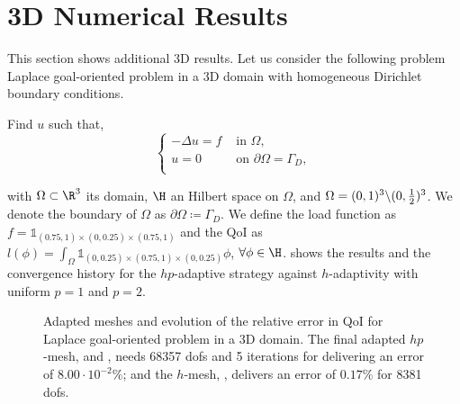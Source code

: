 \section{3D Numerical Results}
\label{sec:Numerical3D}
This section shows additional 3D results. Let us consider the following problem Laplace goal-oriented problem in a $3$D domain with homogeneous Dirichlet boundary conditions.
\begin{var_for}
  Find $u$ such that,
  \begin{equation}
    \begin{cases}
      - \Delta u=f & \text{ in } \Omega,                       \\
      u=0          & \text{ on } {\partial \Omega=\Gamma_{D}}, \\
    \end{cases}
  \end{equation}
\end{var_for}
\noindent with $\Omega\subset \R^{3}$ its domain, $\H$ an Hilbert space on $\Omega$, and $\Omega=(0,1)^{3}\symbol{92} (0,\frac{1}{2})^{3}$. We denote the boundary of $\Omega$ as $\partial \Omega \coloneqq \Gamma_{D}$. We define the load function as $f =\mathds{1}_{(0.75,1) \times (0,0.25) \times (0.75,1)}$ and the \ac{QoI} as $l(\phi)=\int_{\Omega} \mathds{1}_{(0,0.25) \times (0.75,1) \times (0,0.25)}\phi$, $\forall \phi \in \H$.  shows the results and the convergence history for the $hp$-adaptive strategy against $h$-adaptivity with uniform $p=1$ and $p=2$.
\begin{figure}
  \caption{Adapted meshes and evolution of the relative error in \ac{QoI} for Laplace goal-oriented problem in a $3$D domain. The final adapted $hp$-mesh,  and , needs 68357 \acp{dof} and 5 iterations for delivering an error of $8.00\cdot10^{-2} \%$; and the $h$-mesh, , delivers an error of $0.17 \%$ for 8381 \acp{dof}.}
  \label{fig:resultslaplace3D}
\end{figure}
